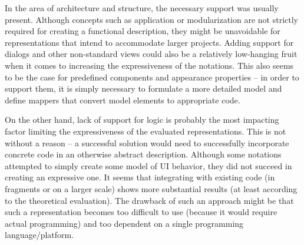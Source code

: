 In the area of architecture and structure, the necessary support was usually present.
Although concepts such as application or modularization are not strictly required for creating a functional description, they might be unavoidable for representations that intend to accommodate larger projects.
Adding support for dialogs and other non-standard views could also be a relatively low-hanging fruit when it comes to increasing the expressiveness of the notations.
This also seems to be the case for predefined components and appearance properties -- in order to support them, it is simply necessary to formulate a more detailed model and define mappers that convert model elements to appropriate code.

On the other hand, lack of support for logic is probably the most impacting factor limiting the expressiveness of the evaluated representations.
This is not without a reason -- a successful solution would need to successfully incorporate concrete code in an otherwise abstract description.
Although some notations attempted to simply create some model of UI behavior, they did not succeed in creating an expressive one.
It seems that integrating with existing code (in fragments or on a larger scale) shows more substantial results (at least according to the theoretical evaluation).
The drawback of such an approach might be that such a representation becomes too difficult to use (because it would require actual programming) and too dependent on a single programming language/platform.

